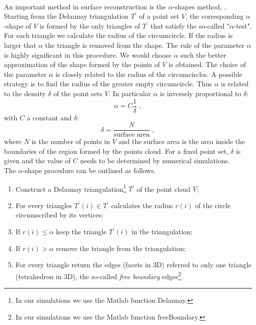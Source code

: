 \\ \indent An important method in surface reconstruction is the $\alpha$-shapes method, \cite{edelsbrunner2010alpha, guo1997surface}. Starting from the Delaunay triangulation $T^\prime$ of a point set $V$, the corresponding $\alpha$-shape of $V$ is formed by the only triangles of $T^\prime$ that satisfy the so-called "$\alpha$-test".
For each triangle we calculate the radius of the circumcircle. If the radius is larger that $\alpha$ the triangle is removed from the shape. The rule of the parameter $\alpha$ is highly significant in this procedure. We would choose $\alpha$ such the better approximation of the shape formed by the points of $V$ is obtained. 
The choice of the parameter $\alpha$ is closely related to the radius of the circumcircles. A possible strategy is to find the radius of the greater empty circumcircle. Thus $\alpha$ is related to the density $\delta$ of the point sets $V$. In particular $\alpha$ is inversely proportional to $\delta$:
\begin{equation}
\alpha=C\frac{1}{\delta}\;,
\end{equation}
with $C$ a constant and $\delta$:
\begin{equation}
\delta=\frac{N}{\mbox{surface area}}\; ,
\end{equation}
where $N$ is the number of points in $V$ and the surface area is the area inside the boundaries of the region formed by the points cloud. 
For a fixed point set, $\delta$ is given and the value of $C$ needs to be determined by numerical simulations.\\ \indent 
The $\alpha$-shape procedure can be outlined as follows.
\begin{enumerate}
\item Construct a Delaunay triangulation\footnote{In our simulations we use the Matlab function Delaunay.} $T^\prime$ of the point cloud $V$;
\item For every triangles $T^\prime(i)\in T^\prime$ calculates the radius $r(i)$ of the circle circumscribed by its vertices;
\item If $r(i)\leq\alpha$ keep the triangle $T^\prime(i)$ in the triangulation;
\item If $r(i)>\alpha$ remove the triangle from the triangulation;
\item For every triangle return the edges (facets in $3$D) referred to only one triangle (tetrahedron in $3$D), the so-called \textit{free boundary} edges\footnote{In our simulations we use the Matlab function freeBoundary.}.
\end{enumerate}
